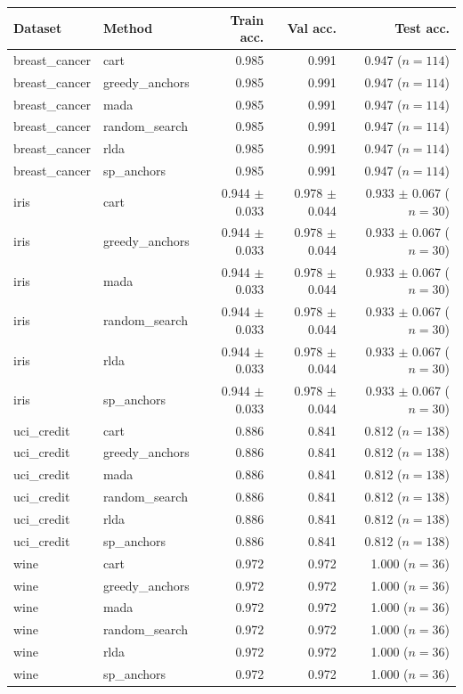 \begin{tabular}{llrrr}
\toprule
Dataset & Method & Train acc. & Val acc. & Test acc. \\
\midrule
breast_cancer & cart & 0.985 & 0.991 & 0.947 ($n=114$) \\
breast_cancer & greedy_anchors & 0.985 & 0.991 & 0.947 ($n=114$) \\
breast_cancer & mada & 0.985 & 0.991 & 0.947 ($n=114$) \\
breast_cancer & random_search & 0.985 & 0.991 & 0.947 ($n=114$) \\
breast_cancer & rlda & 0.985 & 0.991 & 0.947 ($n=114$) \\
breast_cancer & sp_anchors & 0.985 & 0.991 & 0.947 ($n=114$) \\
iris & cart & 0.944 $\pm$ 0.033 & 0.978 $\pm$ 0.044 & 0.933 $\pm$ 0.067 ($n=30$) \\
iris & greedy_anchors & 0.944 $\pm$ 0.033 & 0.978 $\pm$ 0.044 & 0.933 $\pm$ 0.067 ($n=30$) \\
iris & mada & 0.944 $\pm$ 0.033 & 0.978 $\pm$ 0.044 & 0.933 $\pm$ 0.067 ($n=30$) \\
iris & random_search & 0.944 $\pm$ 0.033 & 0.978 $\pm$ 0.044 & 0.933 $\pm$ 0.067 ($n=30$) \\
iris & rlda & 0.944 $\pm$ 0.033 & 0.978 $\pm$ 0.044 & 0.933 $\pm$ 0.067 ($n=30$) \\
iris & sp_anchors & 0.944 $\pm$ 0.033 & 0.978 $\pm$ 0.044 & 0.933 $\pm$ 0.067 ($n=30$) \\
uci_credit & cart & 0.886 & 0.841 & 0.812 ($n=138$) \\
uci_credit & greedy_anchors & 0.886 & 0.841 & 0.812 ($n=138$) \\
uci_credit & mada & 0.886 & 0.841 & 0.812 ($n=138$) \\
uci_credit & random_search & 0.886 & 0.841 & 0.812 ($n=138$) \\
uci_credit & rlda & 0.886 & 0.841 & 0.812 ($n=138$) \\
uci_credit & sp_anchors & 0.886 & 0.841 & 0.812 ($n=138$) \\
wine & cart & 0.972 & 0.972 & 1.000 ($n=36$) \\
wine & greedy_anchors & 0.972 & 0.972 & 1.000 ($n=36$) \\
wine & mada & 0.972 & 0.972 & 1.000 ($n=36$) \\
wine & random_search & 0.972 & 0.972 & 1.000 ($n=36$) \\
wine & rlda & 0.972 & 0.972 & 1.000 ($n=36$) \\
wine & sp_anchors & 0.972 & 0.972 & 1.000 ($n=36$) \\
\bottomrule
\end{tabular}
